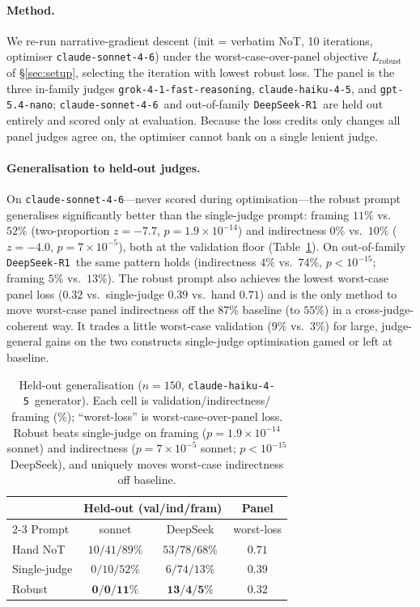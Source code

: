 \documentclass[11pt]{article}
\newcommand{\nano}{\texttt{gpt-5.4-nano}}
\newcommand{\haiku}{\texttt{claude-haiku-4-5}}
\newcommand{\sonnet}{\texttt{claude-sonnet-4-6}}
\newcommand{\grok}{\texttt{grok-4-1-fast-reasoning}}
\newcommand{\deepseek}{\texttt{DeepSeek-R1}}
\begin{document}
\paragraph{Method.}
We re-run narrative-gradient descent (init = verbatim NoT, 10 iterations, optimiser \sonnet) under the
worst-case-over-panel objective $L_{\text{robust}}$ of \S\ref{sec:setup}, selecting the iteration with
lowest robust loss. The panel is the three in-family judges \grok, \haiku, and \nano; \sonnet\ and
out-of-family \deepseek\ are
held out entirely and scored only at evaluation. Because the loss credits only changes all panel judges
agree on, the optimiser cannot bank on a single lenient judge.

\paragraph{Generalisation to held-out judges.}
On \sonnet---never scored during optimisation---the robust prompt generalises significantly better than
the single-judge prompt: framing $11\%$ vs.\ $52\%$ (two-proportion $z{=}-7.7$, $p{=}1.9\times10^{-14}$)
and indirectness $0\%$ vs.\ $10\%$ ($z{=}-4.0$, $p{=}7\times10^{-5}$), both at the validation floor
(Table~\ref{tab:robust}). On out-of-family \deepseek\ the same pattern holds (indirectness $4\%$ vs.\
$74\%$, $p<10^{-15}$; framing $5\%$ vs.\ $13\%$). The robust prompt also achieves the lowest worst-case
panel loss ($0.32$ vs.\ single-judge $0.39$ vs.\ hand $0.71$) and is the only method to move worst-case
panel indirectness off the $87\%$ baseline (to $55\%$) in a cross-judge-coherent way. It trades a little
worst-case validation ($9\%$ vs.\ $3\%$) for large, judge-general gains on the two constructs
single-judge optimisation gamed or left at baseline.

\begin{table}[t]
\centering
\small
\setlength{\tabcolsep}{4pt}
\begin{tabular}{lcc|c}
\toprule
 & \multicolumn{2}{c}{Held-out (val/ind/fram)} & Panel \\
\cmidrule(lr){2-3}
Prompt & sonnet & DeepSeek & worst-loss \\
\midrule
Hand NoT      & $10/41/89\%$ & $53/78/68\%$ & $0.71$ \\
Single-judge  & $0/10/52\%$  & $6/74/13\%$  & $0.39$ \\
Robust        & $\mathbf{0/0/11\%}$ & $\mathbf{13/4/5\%}$ & $\mathbf{0.32}$ \\
\bottomrule
\end{tabular}
\caption{Held-out generalisation ($n{=}150$, \haiku\ generator). Each cell is validation/indirectness/
framing (\%); ``worst-loss'' is worst-case-over-panel loss. Robust beats single-judge on framing
($p{=}1.9{\times}10^{-14}$ sonnet) and indirectness ($p{=}7{\times}10^{-5}$ sonnet; $p<10^{-15}$
DeepSeek), and uniquely moves worst-case indirectness off baseline.}
\label{tab:robust}
\end{table}
\end{document}
